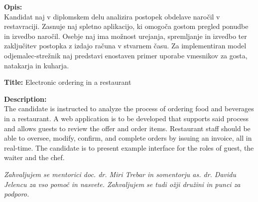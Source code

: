 \documentclass[a4paper, 12pt]{book}
\newcommand{\clearemptydoublepage}{\newpage{\pagestyle{empty}\cleardoublepage}}
\begin{document}
\bigskip
\noindent\textbf{Opis:}\\
Kandidat naj v diplomskem delu analizira postopek obdelave naročil v restavraciji. Zasnuje naj spletno aplikacijo, ki omogoča gostom pregled ponudbe in izvedbo naročil. Osebje naj ima možnost urejanja, spremljanje in izvedbo ter zaključitev postopka z izdajo računa v stvarnem času. Za implementiran model odjemalec-strežnik naj predstavi enostaven primer uporabe vmesnikov za gosta, natakarja in kuharja.

\bigskip
\noindent\textbf{Title:} Electronic ordering in a restaurant

\bigskip
\noindent\textbf{Description:}\\
The candidate is instructed to analyze the process of ordering food and beverages in a restaurant. A web application is to be developed that supports said process and allows guests to review the offer and order items. Restaurant staff should be able to oversee, modify, confirm, and complete orders by issuing an invoice, all in real-time. The candidate is to present example interface for the roles of guest, the waiter and the chef.

\vfill



\vspace{2cm}

\clearemptydoublepage

\thispagestyle{empty}\mbox{}\vfill\null\it%
\noindent
Zahvaljujem se mentorici doc. dr. Miri Trebar in somentorju as. dr. Davidu Jelencu za vso pomoč in nasvete.
Zahvaljujem se tudi ožji družini in punci za podporo.
\rm\normalfont

\clearemptydoublepage


\clearemptydoublepage


\pagestyle{empty}
\def\thepage{}%
\tableofcontents{}

\clearemptydoublepage

\end{document}
